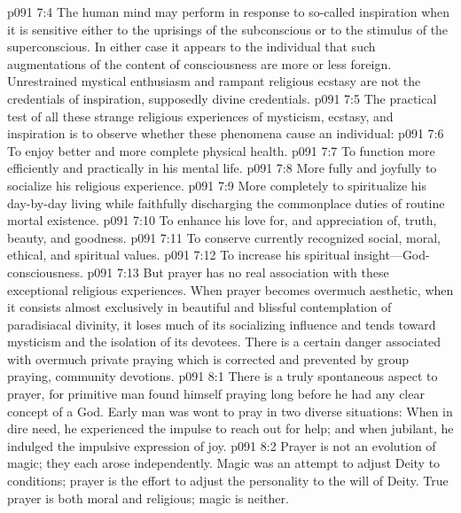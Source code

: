 \vs p091 7:4 The human mind may perform in response to so\hyp{}called inspiration when it is sensitive either to the uprisings of the subconscious or to the stimulus of the superconscious. In either case it appears to the individual that such augmentations of the content of consciousness are more or less foreign. Unrestrained mystical enthusiasm and rampant religious ecstasy are not the credentials of inspiration, supposedly divine credentials.
\vs p091 7:5 The practical test of all these strange religious experiences of mysticism, ecstasy, and inspiration is to observe whether these phenomena cause an individual:
\pc \vs p091 7:6 \bibnobreakspace To enjoy better and more complete physical health.
\vs p091 7:7 \bibnobreakspace To function more efficiently and practically in his mental life.
\vs p091 7:8 \bibnobreakspace More fully and joyfully to socialize his religious experience.
\vs p091 7:9 \bibnobreakspace More completely to spiritualize his day\hyp{}by\hyp{}day living while faithfully discharging the commonplace duties of routine mortal existence.
\vs p091 7:10 \bibnobreakspace To enhance his love for, and appreciation of, truth, beauty, and goodness.
\vs p091 7:11 \bibnobreakspace To conserve currently recognized social, moral, ethical, and spiritual values.
\vs p091 7:12 \bibnobreakspace To increase his spiritual insight---God\hyp{}consciousness.
\pc \vs p091 7:13 But prayer has no real association with these exceptional religious experiences. When prayer becomes overmuch aesthetic, when it consists almost exclusively in beautiful and blissful contemplation of paradisiacal divinity, it loses much of its socializing influence and tends toward mysticism and the isolation of its devotees. There is a certain danger associated with overmuch private praying which is corrected and prevented by group praying, community devotions.\plusone
{}
\vs p091 8:1 There is a truly spontaneous aspect to prayer, for primitive man found himself praying long before he had any clear concept of a God. Early man was wont to pray in two diverse situations: When in dire need, he experienced the impulse to reach out for help; and when jubilant, he indulged the impulsive expression of joy.
\pc \vs p091 8:2 Prayer is not an evolution of magic; they each arose independently. Magic was an attempt to adjust Deity to conditions; prayer is the effort to adjust the personality to the will of Deity. True prayer is both moral and religious; magic is neither.
